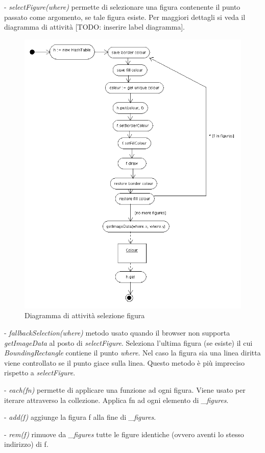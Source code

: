 \begin{elencopuntato}[\subsubsecindent]
\item[-]  \textit{selectFigure(where)} permette di selezionare una figura contenente il punto passato come argomento, se tale figura esiste. Per maggiori dettagli si veda il diagramma di attivit\`a [TODO: inserire label diagramma].

\begin{figure}[!ht]
\centering
\includegraphics[scale=0.5]{defaultselection.png}
\caption{Diagramma di attivit\`a selezione figura}
\end{figure}

\item[-] \textit{fallbackSelection(where)} metodo usato quando il browser non supporta \textit{getImageData} al posto di \textit{selectFigure}. Seleziona l'ultima figura (se esiste) il cui \textit{BoundingRectangle} contiene il punto \textit{where}. Nel caso la figura sia una linea diritta viene controllato se il punto giace sulla linea. Questo metodo \`e pi\`u impreciso rispetto a \textit{selectFigure}.
\item[-]  \textit{each(fn)} permette di applicare una funzione ad ogni figura. Viene usato per iterare attraverso la collezione. Applica fn ad ogni elemento di \textit{{\_}figures}. 
\item[-]  \textit{add(f)} aggiunge la figura f alla fine di \textit{{\_}figures}.
\item[-]  \textit{rem(f)} rimuove da \textit{{\_}figures} tutte le figure identiche (ovvero aventi lo stesso indirizzo) di f.
\end{elencopuntato}


